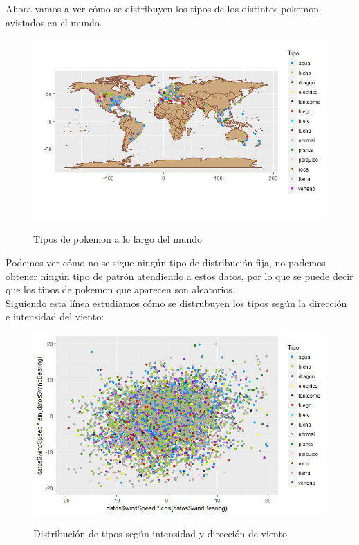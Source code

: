 Ahora vamos a ver cómo se distribuyen los tipos de los distintos pokemon avistados en el mundo.

\begin{figure}[H] %
\centering
\includegraphics[scale=0.8]{img/tiposmundo.jpg}  %
\label{img/tiposmundo.jpg}
\caption{Tipos de pokemon a lo largo del mundo}
\end{figure}

Podemos ver cómo no se sigue ningún tipo de distribución fija, no podemos obtener ningún tipo de patrón atendiendo a estos datos, por lo que se puede decir que los tipos de pokemon que aparecen son aleatorios.\\

Siguiendo esta línea estudiamos cómo se distrubuyen los tipos según la dirección e intensidad del viento:

\begin{figure}[H] %
\centering
\includegraphics[scale=0.8]{img/viento.jpg}  %
\label{img/viento.jpg}
\caption{Distribución de tipos según intensidad y dirección de viento}
\end{figure}

